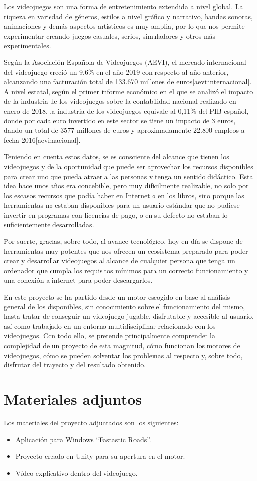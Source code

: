 Los videojuegos son una forma de entretenimiento extendida a nivel global. La riqueza en variedad de géneros, estilos a nivel gráfico y narrativo, bandas sonoras, animaciones y demás aspectos artísticos es muy amplia, por lo que nos permite experimentar creando juegos casuales, serios, simuladores y otros más experimentales.

Según la Asociación Española de Videojuegos (AEVI), el mercado internacional del videojuego creció un 9,6\% en el año 2019 con respecto al año anterior, alcanzando una facturación total de 133.670 millones de euros[aevi:internacional]. A nivel estatal, según el primer informe económico en el que se analizó el impacto de la industria de los videojuegos sobre la contabilidad nacional realizado en enero de 2018, la industria de los videojuegos equivale al 0,11\% del PIB español, donde por cada euro invertido en este sector se tiene un impacto de 3 euros, dando un total de 3577 millones de euros y aproximadamente 22.800 empleos a fecha 2016[aevi:nacional]. 

Teniendo en cuenta estos datos, se es consciente del alcance que tienen los videojuegos y de la oportunidad que puede ser aprovechar los recursos disponibles para crear uno que pueda atraer a las personas y tenga un sentido didáctico. Esta idea hace unos años era concebible, pero muy difícilmente realizable, no solo por los escasos recursos que podía haber en Internet o en los libros, sino porque las herramientas no estaban disponibles para un usuario estándar que no pudiese invertir en programas con licencias de pago, o en su defecto no estaban lo suficientemente desarrolladas.

Por suerte, gracias, sobre todo, al avance tecnológico, hoy en día se dispone de herramientas muy potentes que nos ofrecen un ecosistema preparado para poder crear y desarrollar videojuegos al alcance de cualquier persona que tenga un ordenador que cumpla los requisitos mínimos para un correcto funcionamiento y una conexión a internet para poder descargarlos.

En este proyecto se ha partido desde un motor escogido en base al análisis general de los disponibles, sin conocimiento sobre el funcionamiento del mismo, hasta tratar de conseguir un videojuego jugable, disfrutable y accesible al usuario, así como trabajado en un entorno multidisciplinar relacionado con los videojuegos. Con todo ello, se pretende principalmente comprender la complejidad de un proyecto de esta magnitud, cómo funcionan los motores de videojuegos, cómo se pueden solventar los problemas al respecto y, sobre todo, disfrutar del trayecto y del resultado obtenido.

\section{Materiales adjuntos}

Los materiales del proyecto adjuntados son los siguientes:

\begin{itemize}
\tightlist
	\item Aplicación para Windows ``Fastastic Roads''.
	\item Proyecto creado en Unity para su apertura en el motor.
	\item Vídeo explicativo dentro del videojuego.
\end{itemize}